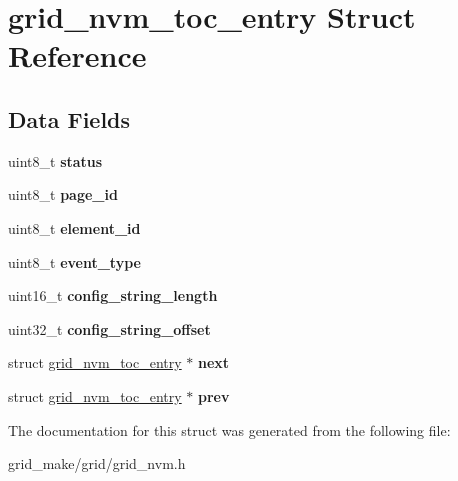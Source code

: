 \hypertarget{structgrid__nvm__toc__entry}{\section{grid\-\_\-nvm\-\_\-toc\-\_\-entry Struct Reference}
\label{structgrid__nvm__toc__entry}
}
\subsection*{Data Fields}
\begin{DoxyCompactItemize}
\item 
\hypertarget{structgrid__nvm__toc__entry_ad888e58fcd750296a004ecdcaa76a6c9}{uint8\-\_\-t {\bfseries status}}\label{structgrid__nvm__toc__entry_ad888e58fcd750296a004ecdcaa76a6c9}

\item 
\hypertarget{structgrid__nvm__toc__entry_a071f1192c5613e5aaab31f4feea382bc}{uint8\-\_\-t {\bfseries page\-\_\-id}}\label{structgrid__nvm__toc__entry_a071f1192c5613e5aaab31f4feea382bc}

\item 
\hypertarget{structgrid__nvm__toc__entry_a05647c8981fecde114e4af11b10bc660}{uint8\-\_\-t {\bfseries element\-\_\-id}}\label{structgrid__nvm__toc__entry_a05647c8981fecde114e4af11b10bc660}

\item 
\hypertarget{structgrid__nvm__toc__entry_a7d2c6509cae0a8e001f98183836998ba}{uint8\-\_\-t {\bfseries event\-\_\-type}}\label{structgrid__nvm__toc__entry_a7d2c6509cae0a8e001f98183836998ba}

\item 
\hypertarget{structgrid__nvm__toc__entry_a5c25ea5804e8b5e5a90c41d5dadf0ecc}{uint16\-\_\-t {\bfseries config\-\_\-string\-\_\-length}}\label{structgrid__nvm__toc__entry_a5c25ea5804e8b5e5a90c41d5dadf0ecc}

\item 
\hypertarget{structgrid__nvm__toc__entry_aae5a2ec060a45ad8b8b5ff4e5b756315}{uint32\-\_\-t {\bfseries config\-\_\-string\-\_\-offset}}\label{structgrid__nvm__toc__entry_aae5a2ec060a45ad8b8b5ff4e5b756315}

\item 
\hypertarget{structgrid__nvm__toc__entry_a2a8af9534bbb741906ea41d1e3bf551a}{struct \hyperlink{structgrid__nvm__toc__entry}{grid\-\_\-nvm\-\_\-toc\-\_\-entry} $\ast$ {\bfseries next}}\label{structgrid__nvm__toc__entry_a2a8af9534bbb741906ea41d1e3bf551a}

\item 
\hypertarget{structgrid__nvm__toc__entry_a6b7c0a955653bc6abc31b28ccad1dbe1}{struct \hyperlink{structgrid__nvm__toc__entry}{grid\-\_\-nvm\-\_\-toc\-\_\-entry} $\ast$ {\bfseries prev}}\label{structgrid__nvm__toc__entry_a6b7c0a955653bc6abc31b28ccad1dbe1}

\end{DoxyCompactItemize}


The documentation for this struct was generated from the following file\-:\begin{DoxyCompactItemize}
\item 
grid\-\_\-make/grid/grid\-\_\-nvm.\-h\end{DoxyCompactItemize}

